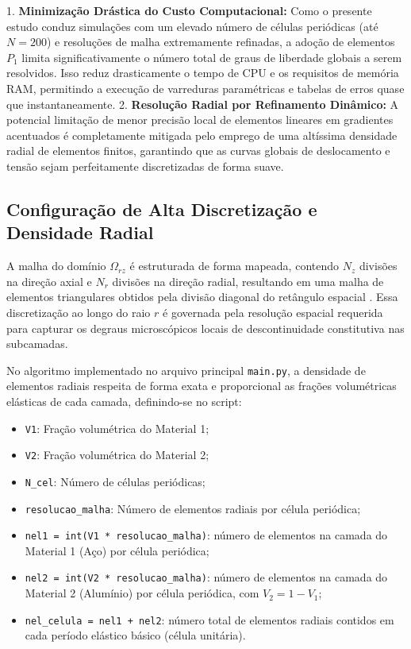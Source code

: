 1. \textbf{Minimização Drástica do Custo Computacional:} Como o presente estudo conduz simulações com um elevado número de células periódicas (até $N = 200$) e resoluções de malha extremamente refinadas, a adoção de elementos $P_1$ limita significativamente o número total de graus de liberdade globais a serem resolvidos. Isso reduz drasticamente o tempo de CPU e os requisitos de memória RAM, permitindo a execução de varreduras paramétricas e tabelas de erros quase que instantaneamente.
2. \textbf{Resolução Radial por Refinamento Dinâmico:} A potencial limitação de menor precisão local de elementos lineares em gradientes acentuados é completamente mitigada pelo emprego de uma altíssima densidade radial de elementos finitos, garantindo que as curvas globais de deslocamento e tensão sejam perfeitamente discretizadas de forma suave.

\subsection{Configuração de Alta Discretização e Densidade Radial}

A malha do domínio $\Omega_{rz}$ é estruturada de forma mapeada, contendo $N_z$ divisões na direção axial e $N_r$ divisões na direção radial, resultando em uma malha de elementos triangulares obtidos pela divisão diagonal do retângulo espacial \cite{logg2012automated}. Essa discretização ao longo do raio $r$ é governada pela resolução espacial requerida para capturar os degraus microscópicos locais de descontinuidade constitutiva nas subcamadas.


No algoritmo implementado no arquivo principal \texttt{main.py}, a densidade de elementos radiais respeita de forma exata e proporcional as frações volumétricas elásticas de cada camada, definindo-se no script:

\begin{itemize}
  \item \texttt{V1}: Fração volumétrica do Material 1;
  \item \texttt{V2}: Fração volumétrica do Material 2;
  \item \texttt{N\_cel}: Número de células periódicas;
  \item \texttt{resolucao\_malha}: Número de elementos radiais por célula periódica;
  \item \texttt{nel1 = int(V1 * resolucao\_malha)}: número de elementos na camada do Material 1 (Aço) por célula periódica;
  \item \texttt{nel2 = int(V2 * resolucao\_malha)}: número de elementos na camada do Material 2 (Alumínio) por célula periódica, com $V_2 = 1 - V_1$;
  \item \texttt{nel\_celula = nel1 + nel2}: número total de elementos radiais contidos em cada período elástico básico (célula unitária).
\end{itemize}

